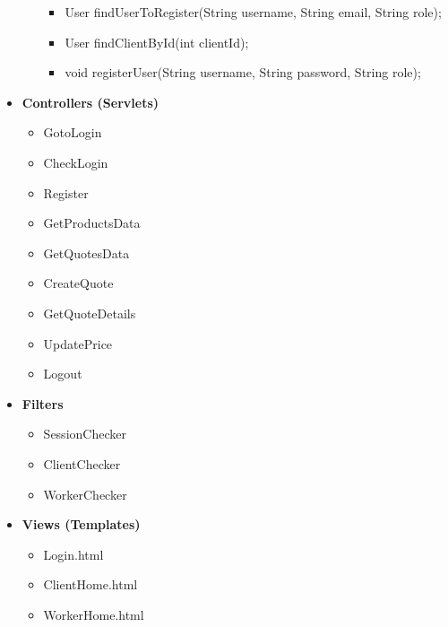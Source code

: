 \documentclass[a4paper, 12pt]{article}
\begin{document}
\begin{itemize}
\begin{itemize}
\begin{itemize}
			\item User findUserToRegister(String username, String email, String role);
			\item User findClientById(int clientId);
			\item void registerUser(String username, String password, String role);
		\end{itemize}
	\end{itemize}
	\item \textbf{Controllers (Servlets)}
	\begin{itemize}
		\item GotoLogin
		\item CheckLogin
		\item Register
		\item GetProductsData
		\item GetQuotesData
		\item CreateQuote
		\item GetQuoteDetails
		\item UpdatePrice
		\item Logout
	\end{itemize}
	\item \textbf{Filters}
	\begin{itemize}
		\item SessionChecker
		\item ClientChecker
		\item WorkerChecker
	\end{itemize}
	\item \textbf{Views (Templates)}
	\begin{itemize}
		\item Login.html
		\item ClientHome.html
		\item WorkerHome.html
	\end{itemize}
\end{itemize}
\end{document}
